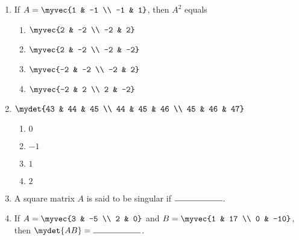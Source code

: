 \documentclass{article}
\begin{document}
\begin{enumerate}
    \item If $A = \myvec{1 & -1 \\ -1 & 1}$, then $A^2$ equals
    \begin{enumerate}
        \item $\myvec{2 & -2 \\ -2 & 2}$
        \item $\myvec{2 & -2 \\ -2 & -2}$
        \item $\myvec{-2 & -2 \\ -2 & 2}$
        \item $\myvec{-2 & 2 \\ 2 & -2}$
    \end{enumerate}

   \item
    $\mydet{43 & 44 & 45 \\ 44 & 45 & 46 \\ 45 & 46 & 47}$
    \begin{enumerate}
        \item $0$
        \item $-1$
        \item $1$
        \item $2$
    \end{enumerate}

    \item A square matrix $A$ is said to be singular if $\rule{2cm}{0.15mm}$.

    \item If $A =\myvec{3 & -5 \\ 2 & 0}$ and 
    $B = \myvec{1 & 17 \\ 0 & -10}$, then $\mydet{AB} = \rule{2cm}{0.15mm}$.

    
\end{enumerate}
\end{document}
